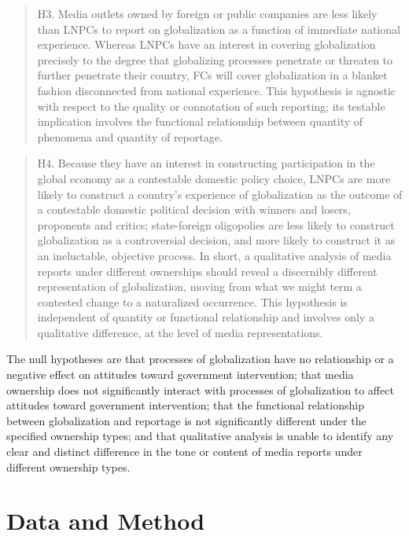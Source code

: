 \documentclass[12pt]{report}
\begin{document}
\singlespacing \begin{quote} H3. Media outlets owned by foreign or public companies are less likely
than LNPCs to report on globalization as a function of immediate national experience. Whereas LNPCs
have an interest in covering globalization precisely to the degree that globalizing processes
penetrate or threaten to further penetrate their country, FCs will cover globalization in a blanket
fashion disconnected from national experience. This hypothesis is agnostic with respect to the
quality or connotation of such reporting; its testable implication involves the functional
relationship between quantity of phenomena and quantity of reportage.\end{quote} \doublespacing

\singlespacing \begin{quote} H4. Because they have an interest in constructing participation in the
global economy as a contestable domestic policy choice, LNPCs are more likely to construct a
country's experience of globalization as the outcome of a contestable domestic political decision
with winners and losers, proponents and critics; state-foreign oligopolies are less likely to
construct globalization as a controversial decision, and more likely to construct it as an
ineluctable, objective process. In short, a qualitative analysis of media reports under different
ownerships should reveal a discernibly different representation of globalization, moving from what
we might term a contested change to a naturalized occurrence. This hypothesis is independent of
quantity or functional relationship and involves only a qualitative difference, at the level of
media representations. \end{quote} \doublespacing

The null hypotheses are that processes of globalization have no relationship or a negative effect on
attitudes toward government intervention; that media ownership does not significantly interact with
processes of globalization to affect attitudes toward government intervention; that the functional
relationship between globalization and reportage is not significantly different under the specified
ownership types; and that qualitative analysis is unable to identify any clear and distinct
difference in the tone or content of media reports under different ownership types.

\section{Data and Method}
\end{document}
